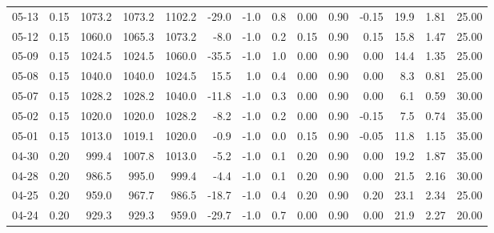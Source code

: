 \begin{threeparttable}
{\begin{tabular}{lrrrrrrrrrrrrr}
  05-13 &     0.15 & 1073.2 & 1073.2 & 1102.2 &      -29.0 &                     -1.0 &                 0.8 &       0.00 &      0.90 &          -0.15 &             19.9 &            1.81 &                  25.00 \\
  05-12 &     0.15 & 1060.0 & 1065.3 & 1073.2 &       -8.0 &                     -1.0 &                 0.2 &       0.15 &      0.90 &           0.15 &             15.8 &            1.47 &                  25.00 \\
  05-09 &     0.15 & 1024.5 & 1024.5 & 1060.0 &      -35.5 &                     -1.0 &                 1.0 &       0.00 &      0.90 &           0.00 &             14.4 &            1.35 &                  25.00 \\
  05-08 &     0.15 & 1040.0 & 1040.0 & 1024.5 &       15.5 &                      1.0 &                 0.4 &       0.00 &      0.90 &           0.00 &              8.3 &            0.81 &                  25.00 \\
  05-07 &     0.15 & 1028.2 & 1028.2 & 1040.0 &      -11.8 &                     -1.0 &                 0.3 &       0.00 &      0.90 &           0.00 &              6.1 &            0.59 &                  30.00 \\
  05-02 &     0.15 & 1020.0 & 1020.0 & 1028.2 &       -8.2 &                     -1.0 &                 0.2 &       0.00 &      0.90 &          -0.15 &              7.5 &            0.74 &                  35.00 \\
  05-01 &     0.15 & 1013.0 & 1019.1 & 1020.0 &       -0.9 &                     -1.0 &                 0.0 &       0.15 &      0.90 &          -0.05 &             11.8 &            1.15 &                  35.00 \\
  04-30 &     0.20 &  999.4 & 1007.8 & 1013.0 &       -5.2 &                     -1.0 &                 0.1 &       0.20 &      0.90 &           0.00 &             19.2 &            1.87 &                  35.00 \\
  04-28 &     0.20 &  986.5 &  995.0 &  999.4 &       -4.4 &                     -1.0 &                 0.1 &       0.20 &      0.90 &           0.00 &             21.5 &            2.16 &                  30.00 \\
  04-25 &     0.20 &  959.0 &  967.7 &  986.5 &      -18.7 &                     -1.0 &                 0.4 &       0.20 &      0.90 &           0.20 &             23.1 &            2.34 &                  25.00 \\
  04-24 &     0.20 &  929.3 &  929.3 &  959.0 &      -29.7 &                     -1.0 &                 0.7 &       0.00 &      0.90 &           0.00 &             21.9 &            2.27 &                  20.00 \\

\end{tabular}}
\end{threeparttable}
